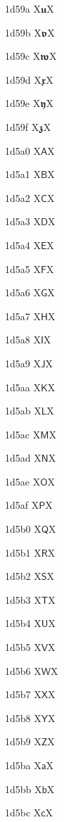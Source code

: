 \documentclass[11pt]{article}
\begin{document}
1d59a X{\ensuremath{\mathbffrak{u}}}X

1d59b X{\ensuremath{\mathbffrak{v}}}X

1d59c X{\ensuremath{\mathbffrak{w}}}X

1d59d X{\ensuremath{\mathbffrak{x}}}X

1d59e X{\ensuremath{\mathbffrak{y}}}X

1d59f X{\ensuremath{\mathbffrak{z}}}X

1d5a0 X{\ensuremath{\mathsf{A}}}X

1d5a1 X{\ensuremath{\mathsf{B}}}X

1d5a2 X{\ensuremath{\mathsf{C}}}X

1d5a3 X{\ensuremath{\mathsf{D}}}X

1d5a4 X{\ensuremath{\mathsf{E}}}X

1d5a5 X{\ensuremath{\mathsf{F}}}X

1d5a6 X{\ensuremath{\mathsf{G}}}X

1d5a7 X{\ensuremath{\mathsf{H}}}X

1d5a8 X{\ensuremath{\mathsf{I}}}X

1d5a9 X{\ensuremath{\mathsf{J}}}X

1d5aa X{\ensuremath{\mathsf{K}}}X

1d5ab X{\ensuremath{\mathsf{L}}}X

1d5ac X{\ensuremath{\mathsf{M}}}X

1d5ad X{\ensuremath{\mathsf{N}}}X

1d5ae X{\ensuremath{\mathsf{O}}}X

1d5af X{\ensuremath{\mathsf{P}}}X

1d5b0 X{\ensuremath{\mathsf{Q}}}X

1d5b1 X{\ensuremath{\mathsf{R}}}X

1d5b2 X{\ensuremath{\mathsf{S}}}X

1d5b3 X{\ensuremath{\mathsf{T}}}X

1d5b4 X{\ensuremath{\mathsf{U}}}X

1d5b5 X{\ensuremath{\mathsf{V}}}X

1d5b6 X{\ensuremath{\mathsf{W}}}X

1d5b7 X{\ensuremath{\mathsf{X}}}X

1d5b8 X{\ensuremath{\mathsf{Y}}}X

1d5b9 X{\ensuremath{\mathsf{Z}}}X

1d5ba X{\ensuremath{\mathsf{a}}}X

1d5bb X{\ensuremath{\mathsf{b}}}X

1d5bc X{\ensuremath{\mathsf{c}}}X
\end{document}
